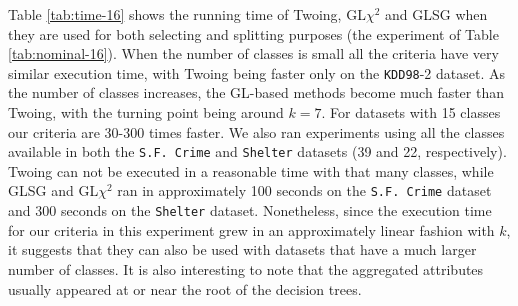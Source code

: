 Table \ref{tab:time-16} shows the running time of Twoing, GL$\chi^2$ and GLSG  when
they are used for both selecting and splitting purposes (the experiment of Table \ref{tab:nominal-16}).
When the number of classes is small all the criteria have very similar execution time, with Twoing being faster only on the {\tt KDD98}-2 dataset. As the number of classes increases, the GL-based methods become much faster than Twoing, with the turning point being around $k=7$. For datasets with 15 classes our criteria are 30-300 times faster. We also ran experiments using all the classes available in both the {\tt S.F. Crime} and {\tt Shelter} datasets (39 and 22, respectively). Twoing can not be executed in a reasonable time with that many classes, while GLSG and GL$\chi^2$ ran in approximately 100 seconds on the {\tt S.F. Crime} dataset and  300 seconds on the {\tt Shelter} dataset. Nonetheless, since the execution time for our criteria in this experiment grew in an approximately linear fashion with $k$, it suggests that they can also be used with datasets that have a much larger number of classes. It is also interesting to note that the aggregated attributes usually appeared at or near the root of the decision trees.


